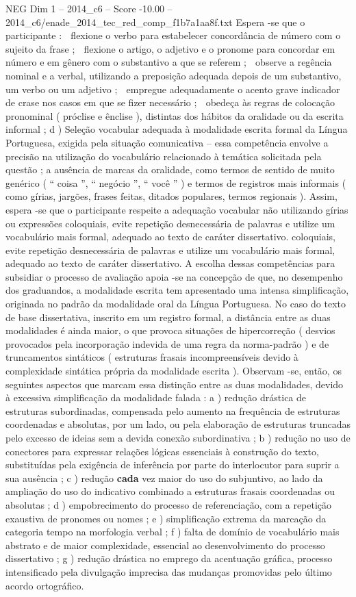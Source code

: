 \begin{textsample}{NEG Dim 1 – 2014\_c6 – Score -10.00 – 2014\_c6/enade\_2014\_tec\_red\_comp\_f1b7a1aa8f.txt}
Espera -se que o participante :  flexione o verbo para estabelecer concordância de número com o sujeito da frase ;  flexione o artigo, o adjetivo e o pronome para concordar em número e em gênero com o substantivo a que se referem ;  observe a regência nominal e a verbal, utilizando a preposição adequada depois de um substantivo, um verbo ou um adjetivo ;  empregue adequadamente o acento grave indicador de crase nos casos em que se fizer necessário ;  obedeça às regras de colocação pronominal ( próclise e ênclise ), distintas dos hábitos da oralidade ou da escrita informal ; d ) Seleção vocabular adequada à modalidade escrita formal da Língua Portuguesa, exigida pela situação comunicativa – essa competência envolve a precisão na utilização do vocabulário relacionado à temática solicitada pela questão ; a ausência de marcas da oralidade, como termos de sentido de muito genérico ( “ coisa ”, “ negócio ”, “ você ” ) e termos de registros mais informais ( como gírias, jargões, frases feitas, ditados populares, termos regionais ).
Assim, espera -se que o participante respeite a adequação vocabular não utilizando gírias ou expressões coloquiais, evite repetição desnecessária de palavras e utilize um vocabulário mais formal, adequado ao texto de caráter dissertativo. coloquiais, evite repetição desnecessária de palavras e utilize um vocabulário mais formal, adequado ao texto de caráter dissertativo.
A escolha dessas competências para subsidiar o processo de avaliação apoia -se na concepção de que, no desempenho dos graduandos, a modalidade escrita tem apresentado uma intensa simplificação, originada no padrão da modalidade oral da Língua Portuguesa.
No caso do texto de base dissertativa, inscrito em um registro formal, a distância entre as duas modalidades é ainda maior, o que provoca situações de hipercorreção ( desvios provocados pela incorporação indevida de uma regra da norma-padrão ) e de truncamentos sintáticos ( estruturas frasais incompreensíveis devido à complexidade sintática própria da modalidade escrita ).
Observam -se, então, os seguintes aspectos que marcam essa distinção entre as duas modalidades, devido à excessiva simplificação da modalidade falada : a ) redução drástica de estruturas subordinadas, compensada pelo aumento na frequência de estruturas coordenadas e absolutas, por um lado, ou pela elaboração de estruturas truncadas pelo excesso de ideias sem a devida conexão subordinativa ; b ) redução no uso de conectores para expressar relações lógicas essenciais à construção do texto, substituídas pela exigência de inferência por parte do interlocutor para suprir a sua ausência ; c ) redução \textbf{cada} vez maior do uso do subjuntivo, ao lado da ampliação do uso do indicativo combinado a estruturas frasais coordenadas ou absolutas ; d ) empobrecimento do processo de referenciação, com a repetição exaustiva de pronomes ou nomes ; e ) simplificação extrema da marcação da categoria tempo na morfologia verbal ; f ) falta de domínio de vocabulário mais abstrato e de maior complexidade, essencial ao desenvolvimento do processo dissertativo ; g ) redução drástica no emprego da acentuação gráfica, processo intensificado pela divulgação imprecisa das mudanças promovidas pelo último acordo ortográfico.

\end{textsample}
